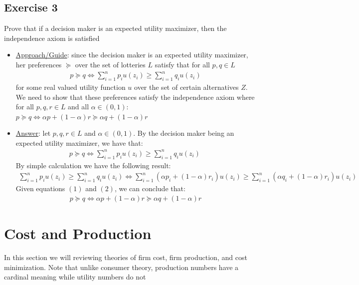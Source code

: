 \documentclass{article}
\begin{document}
\subsection{Exercise 3}
Prove that if a decision maker is an expected utility maximizer, then the independence axiom is satisfied \par \vspace{0.3em}
\begin{itemize}
  \item  \underline{Approach/Guide}: since the decision maker is an expected utility maximizer, her preferences $\succeq$ over the set of lotteries $L$ satisfy that for all $p,q \in L$
  \begin{gather*}
    p \succeq q \Leftrightarrow \sum_{i=1}^{n} p_{i}u(z_{i}) \geq \sum_{i=1}^{n} q_{i}u(z_{i})
  \end{gather*}
  for some real valued utility function $u$ over the set of certain alternatives $Z$. We need to show that these preferences satisfy the independence axiom where for all $p,q,r \in L$ and all $\alpha \in (0,1)$: $p \succeq q \Leftrightarrow \alpha p + (1-\alpha)r \succeq \alpha q + (1-\alpha)r$
  \item  \underline{Answer}: let $p,q,r \in L$ and $\alpha \in (0,1)$. By the decision maker being an expected utility maximizer, we have that:
  \begin{gather*}
    p \succeq q \Leftrightarrow \sum_{i=1}^{n} p_{i}u(z_{i}) \geq \sum_{i=1}^{n} q_{i}u(z_{i}) \ \tag{1}
  \end{gather*}
  By simple calculation we have the following result:
  \begin{gather*}
    \sum_{i=1}^{n} p_{i}u(z_{i}) \geq \sum_{i=1}^{n} q_{i}u(z_{i}) \Leftrightarrow \sum_{i=1}^{n} (\alpha p_{i} + (1- \alpha) r_{i})u(z_{i}) \geq \sum_{i=1}^{n} (\alpha q_{i} + (1- \alpha) r_{i})u(z_{i}) \ \tag{2}
  \end{gather*}
  Given equations $(1)$ and $(2)$, we can conclude that:
  \begin{gather*}
    p \succeq q \Leftrightarrow \alpha p + (1-\alpha)r \succeq \alpha q + (1-\alpha)r
  \end{gather*}
\end{itemize}



\newpage

\vspace{2.5mm}
\section{Cost and Production}
In this section we will reviewing theories of firm cost, firm production, and cost minimization. Note that unlike consumer theory, production numbers have a cardinal meaning while utility numbers do not
\vspace{6mm}
\end{document}

